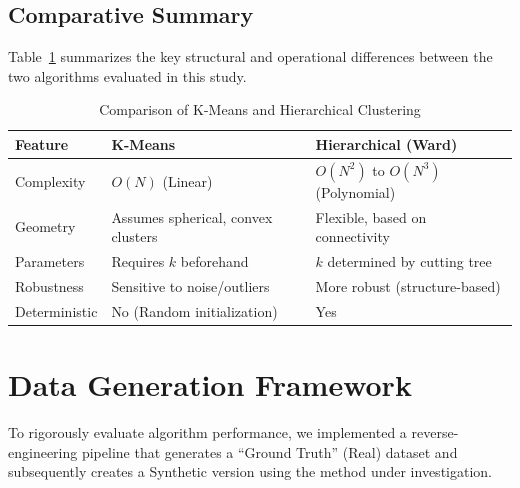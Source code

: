 \subsection{Comparative Summary}
Table~\ref{tab:kmeans_vs_hc} summarizes the key structural and operational differences between the two algorithms evaluated in this study.

\begin{table}[H]
  \centering
  \caption{Comparison of K-Means and Hierarchical Clustering}
  \label{tab:kmeans_vs_hc}
  \renewcommand{\arraystretch}{1.2}
  \begin{tabular}{@{}lp{5.8cm}p{5.8cm}@{}}
    \toprule
    \textbf{Feature} & \textbf{K-Means} & \textbf{Hierarchical (Ward)} \\ \midrule
    Complexity & $O(N)$ (Linear) & $O(N^2)$ to $O(N^3)$ (Polynomial) \\
    Geometry & Assumes spherical, convex clusters & Flexible, based on connectivity \\
    Parameters & Requires $k$ beforehand & $k$ determined by cutting tree \\
    Robustness & Sensitive to noise/outliers & More robust (structure-based) \\
    Deterministic & No (Random initialization) & Yes \\ \bottomrule
  \end{tabular}
\end{table}

\section{Data Generation Framework}
\label{sec:data-generation-framework}

To rigorously evaluate algorithm performance, we implemented a reverse-engineering pipeline that generates a ``Ground Truth'' (Real) dataset and subsequently creates a Synthetic version using the method under investigation.


